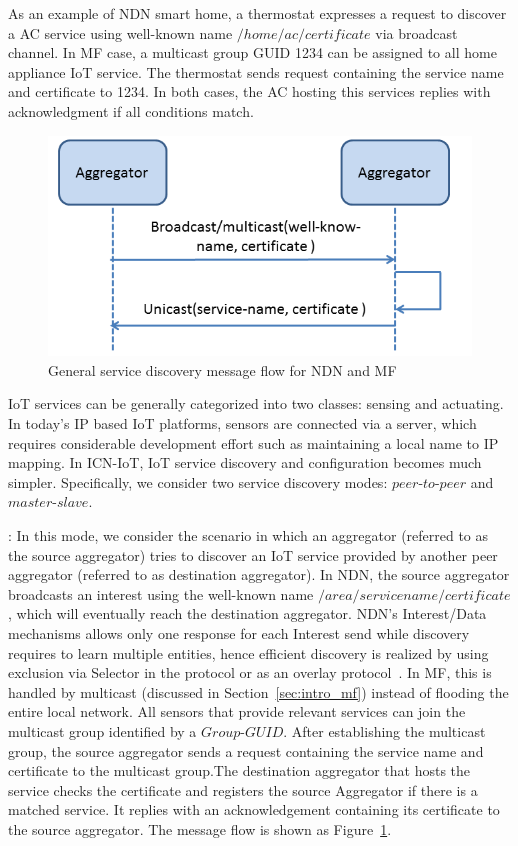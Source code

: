 As an example of NDN smart home, a thermostat expresses a request to
discover a AC service using well-known name $/home/ac/certificate$ via
broadcast channel.  In MF case, a multicast group GUID 1234 can be
assigned to all home appliance IoT service.  The thermostat sends
request containing the service name and certificate to 1234.  In both
cases, the AC hosting this services replies with acknowledgment if
all conditions match.
\begin{figure}
\includegraphics[width=\columnwidth]{figure/service_discovery.png}
\caption{\label{fig:ser_dis}General service discovery message flow for NDN and MF}
\end{figure}
\vspace{-1mm}
\iffalse
IoT services can be generally categorized into two classes: sensing and actuating. In today's IP based IoT platforms, sensors are connected via a server, which requires considerable development effort such as maintaining a local name to IP mapping. In ICN-IoT, IoT service discovery and configuration becomes much simpler. Specifically, we consider two service discovery modes: $peer$-$to$-$peer$ and $master$-$slave$.


\vspace{1mm}: In this mode, we consider the scenario in which an aggregator (referred to as the source aggregator) tries to discover an IoT service provided by another peer aggregator (referred to as destination aggregator). In NDN, the source aggregator broadcasts an interest using the well-known name $/area/servicename/certificate$, which will eventually reach the destination aggregator. NDN's Interest/Data mechanisms allows only one response for each Interest send while discovery requires to learn multiple entities, hence efficient discovery is realized by using exclusion via Selector in the protocol or as an overlay protocol~\cite{ravindran2013information}. In MF, this is handled by multicast (discussed in Section~\ref{sec:intro_mf}) instead of flooding the entire local network. All sensors that provide relevant services can join the multicast group identified by a $Group$-$GUID$. After establishing the multicast group, the source aggregator sends a request containing the service name and certificate to the multicast group.The destination aggregator that hosts the service checks the certificate and registers the source Aggregator if there is a matched service. It replies with an acknowledgement containing its certificate to the source aggregator. The message flow is shown as Figure~\ref{fig:ser_dis}.


